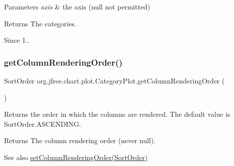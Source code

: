 \begin{DoxyParams}{Parameters}
{\em axis} & the axis ({\ttfamily null} not permitted)\\
\hline
\end{DoxyParams}
\begin{DoxyReturn}{Returns}
The categories.
\end{DoxyReturn}
\begin{DoxySince}{Since}
1.. 
\end{DoxySince}
\mbox{\label{classorg_1_1jfree_1_1chart_1_1plot_1_1_category_plot_aa917b1012005f1b7ca9766c1e7b693bd}} 
\subsubsection{\texorpdfstring{get\+Column\+Rendering\+Order()}{getColumnRenderingOrder()}}
{\footnotesize\ttfamily Sort\+Order org.\+jfree.\+chart.\+plot.\+Category\+Plot.\+get\+Column\+Rendering\+Order (\begin{DoxyParamCaption}{ }\end{DoxyParamCaption})}

Returns the order in which the columns are rendered. The default value is {\ttfamily Sort\+Order.\+A\+S\+C\+E\+N\+D\+I\+NG}.

\begin{DoxyReturn}{Returns}
The column rendering order (never {\ttfamily null}).
\end{DoxyReturn}
\begin{DoxySeeAlso}{See also}
\mbox{\hyperlink{classorg_1_1jfree_1_1chart_1_1plot_1_1_category_plot_a2c7648bb5408634ddf9af63510c52773}{set\+Column\+Rendering\+Order(\+Sort\+Order)}} 
\end{DoxySeeAlso}
\mbox{\label{classorg_1_1jfree_1_1chart_1_1plot_1_1_category_plot_ad4daaf3bde6575397d2f2969bc9e73cd}} 
